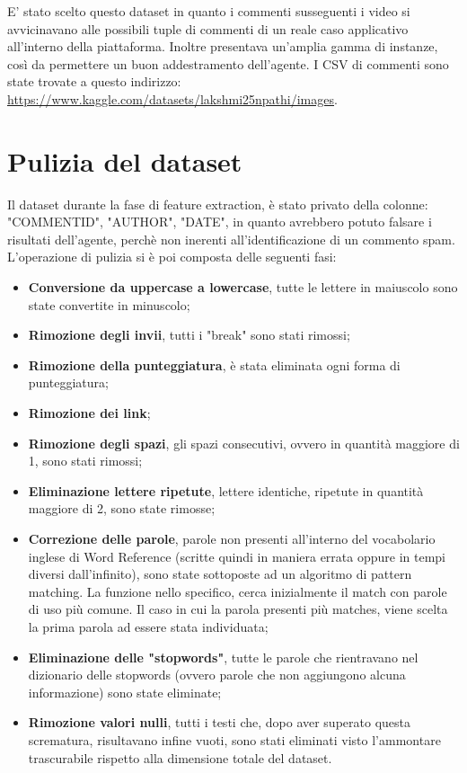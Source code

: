 \documentclass{report}
\begin{document}
    E' stato scelto questo dataset in quanto i commenti susseguenti i video si avvicinavano alle possibili tuple di commenti
    di un reale caso applicativo all'interno della piattaforma.
    Inoltre presentava un'amplia gamma di instanze, così da permettere un buon addestramento dell'agente.
    I CSV di commenti sono state trovate a questo indirizzo: \newline 
    \href{https://www.kaggle.com/datasets/lakshmi25npathi/images}{https://www.kaggle.com/datasets/lakshmi25npathi/images}.
    
    \section{Pulizia del dataset}
    Il dataset durante la fase di feature extraction, 
    è stato privato della colonne: "COMMENT\textunderscore ID", "AUTHOR", "DATE", in quanto avrebbero potuto falsare i risultati dell'agente, 
    perchè non inerenti all'identificazione di un commento spam.
    L'operazione di pulizia si è poi composta delle seguenti fasi: 

    \begin{itemize}
        \item {\bfseries Conversione da uppercase a lowercase}, tutte le lettere in maiuscolo sono state convertite in minuscolo;
        \item {\bfseries Rimozione degli invii}, tutti i "break" sono stati rimossi;
        \item {\bfseries Rimozione della punteggiatura}, è stata eliminata ogni forma di punteggiatura;
        \item {\bfseries Rimozione dei link};
        \item {\bfseries Rimozione degli spazi}, gli spazi consecutivi, ovvero in  quantità maggiore di 1, sono stati rimossi;
        \item {\bfseries Eliminazione lettere ripetute}, lettere identiche, ripetute in quantità maggiore di 2, sono state rimosse;
        \item {\bfseries Correzione delle parole}, parole non presenti all'interno del vocabolario inglese di Word Reference (scritte quindi in maniera errata oppure in tempi diversi dall'infinito), sono state sottoposte 
        ad un algoritmo di pattern matching. La funzione nello specifico, cerca inizialmente il match con parole di uso più comune. Il caso in cui
        la parola presenti più matches, viene scelta la prima parola ad essere stata individuata;
        \item {\bfseries Eliminazione delle "stopwords"}, tutte le parole che rientravano nel dizionario delle stopwords (ovvero parole che non aggiungono alcuna informazione) 
        sono state eliminate;
        \item {\bfseries Rimozione valori nulli}, tutti i testi che, dopo aver superato questa scrematura, risultavano infine vuoti, sono stati eliminati visto l'ammontare trascurabile rispetto alla dimensione totale del dataset.

 
    \end{itemize}
    \newpage
    
\end{document}
